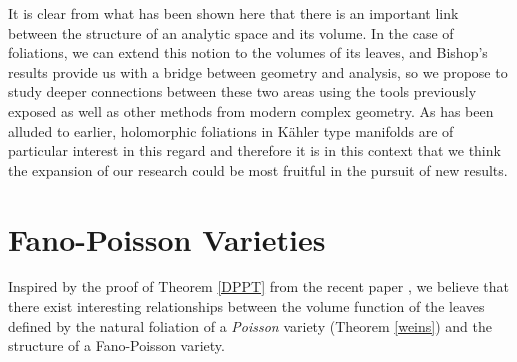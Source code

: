 \documentclass[12pt,twoside,a4paper]{report}
\begin{document}
It is clear from what has been shown here that there is an important link between the structure of an analytic space and its volume.
In the case of foliations, we can extend this notion to the volumes of its leaves, and Bishop's results
provide us with a bridge between geometry and analysis, so we propose to study deeper connections between these
two areas using the tools previously exposed as well as other methods from modern complex geometry.
As has been alluded to earlier, holomorphic foliations in Kähler type manifolds are of particular interest in this regard
and therefore it is in this context that we think the expansion of our research could be most fruitful in the
pursuit of new results.



\section{Fano-Poisson Varieties}
\noindent Inspired by the proof of Theorem \ref{DPPT} from the recent paper \cite{DPPT}, we believe that there exist
interesting relationships between the volume function of the leaves defined by the natural foliation of a \emph{Poisson} variety
(Theorem \ref{weins}) and the structure of a Fano-Poisson variety.
\end{document}
